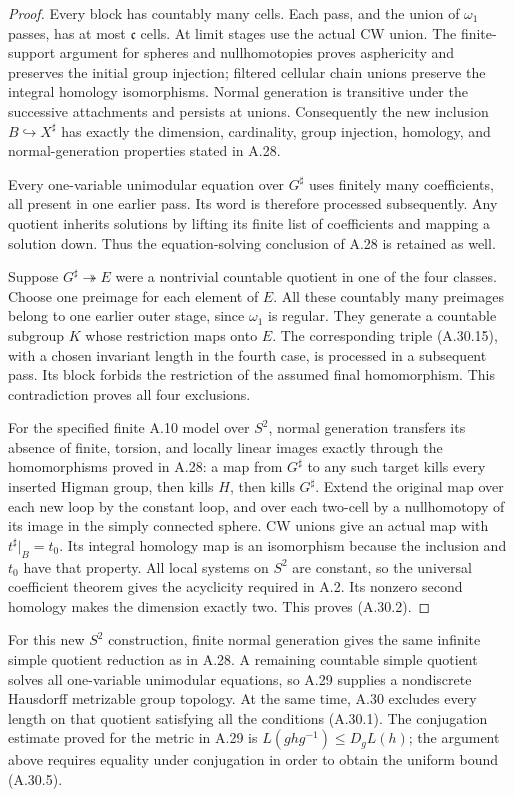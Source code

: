 \begin{proof}
Every block has countably many cells. Each pass,
and the union of $\omega_1$ passes, has at most
$\mathfrak c$ cells. At limit stages use the
actual CW union. The finite-support argument for
spheres and nullhomotopies proves asphericity and
preserves the initial group injection; filtered
cellular chain unions preserve the integral
homology isomorphisms. Normal generation is
transitive under the successive attachments and
persists at unions. Consequently the new inclusion
$B\hookrightarrow X^{\sharp}$ has exactly the
dimension, cardinality, group injection, homology,
and normal-generation properties stated in A.28.

Every one-variable unimodular equation over
$G^{\sharp}$ uses finitely many coefficients,
all present in one earlier pass. Its word is
therefore processed subsequently. Any quotient
inherits solutions by lifting its finite list of
coefficients and mapping a solution down. Thus
the equation-solving conclusion of A.28 is
retained as well.

Suppose $G^{\sharp}\twoheadrightarrow E$ were a
nontrivial countable quotient in one of the four
classes. Choose one preimage for each element of
$E$. All these countably many preimages belong
to one earlier outer stage, since $\omega_1$ is
regular. They generate a countable subgroup $K$
whose restriction maps onto $E$. The corresponding
triple (A.30.15), with a chosen invariant length
in the fourth case, is processed in a subsequent
pass. Its block forbids the restriction of the
assumed final homomorphism. This contradiction
proves all four exclusions.

For the specified finite A.10 model over $S^2$,
normal generation transfers its absence of finite,
torsion, and locally linear images exactly through
the homomorphisms proved in A.28: a map from
$G^{\sharp}$ to any such target kills every
inserted Higman group, then kills $H$, then kills
$G^{\sharp}$. Extend the original map over each
new loop by the constant loop, and over each
two-cell by a nullhomotopy of its image in the
simply connected sphere. CW unions give an actual
map with $t^{\sharp}|_B=t_0$. Its integral homology
map is an isomorphism because the inclusion and
$t_0$ have that property. All local systems on
$S^2$ are constant, so the universal coefficient
theorem gives the acyclicity required in A.2.
Its nonzero second homology makes the dimension
exactly two. This proves (A.30.2).
\end{proof}

For this new $S^2$ construction, finite normal
generation gives the same infinite simple quotient
reduction as in A.28. A remaining countable simple
quotient solves all one-variable unimodular
equations, so A.29 supplies a nondiscrete
Hausdorff metrizable group topology. At the same
time, A.30 excludes every length on that quotient
satisfying all the conditions (A.30.1). The
conjugation estimate proved for the metric in
A.29 is $L(ghg^{-1})\leq D_gL(h)$; the argument
above requires equality under conjugation in
order to obtain the uniform bound (A.30.5).
